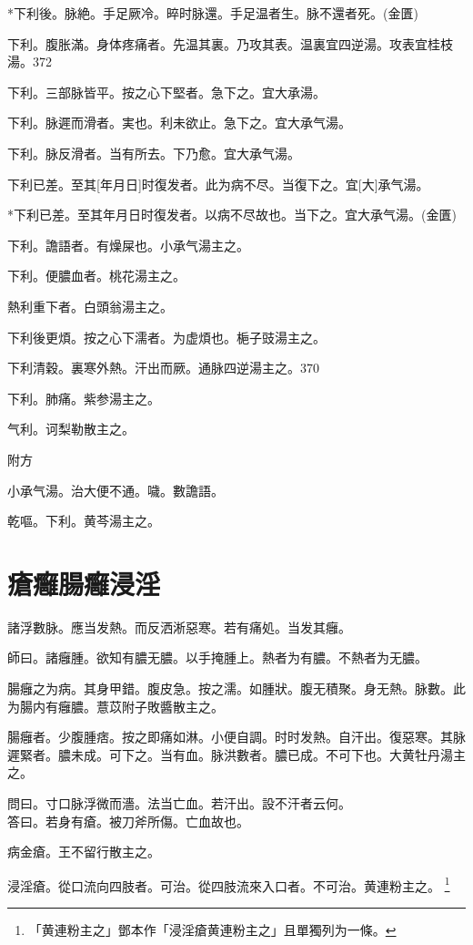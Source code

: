 \documentclass[12pt,oneside,UTF8,b5paper]{ctexbook}她她她她她她她
\begin{document}
*下利後。脉絶。手足厥冷。晬时脉還。手足温者生。脉不還者死。(金匱)

下利。腹胀滿。身体疼痛者。先温其裏。乃攻其表。温裏宜四逆湯。攻表宜桂枝湯。372

下利。三部脉皆平。按之心下堅者。急下之。宜大承湯。

下利。脉遲而滑者。実也。利未欲止。急下之。宜大承气湯。

下利。脉反滑者。当有所去。下乃愈。宜大承气湯。

下利已差。至其[年月日]时復发者。此为病不尽。当復下之。宜[大]承气湯。

*下利已差。至其年月日时復发者。以病不尽故也。当下之。宜大承气湯。(金匱)

下利。譫語者。有燥屎也。小承气湯主之。

下利。便膿血者。桃花湯主之。

熱利重下者。白頭翁湯主之。

下利後更煩。按之心下濡者。为虚煩也。梔子豉湯主之。

下利清穀。裏寒外熱。汗出而厥。通脉四逆湯主之。370

下利。肺痛。紫参湯主之。

气利。诃梨勒散主之。

附方

小承气湯。治大便不通。噦。數譫語。

乾嘔。下利。黄芩湯主之。

\chapter{瘡癰腸癰浸淫}

諸浮數脉。應当发熱。而反洒淅惡寒。若有痛処。当发其癰。

師曰。諸癰腫。欲知有膿无膿。以手掩腫上。熱者为有膿。不熱者为无膿。

腸癰之为病。其身甲錯。腹皮急。按之濡。如腫狀。腹无積聚。身无熱。脉數。此为腸内有癰膿。薏苡附子敗醬散主之。

腸癰者。少腹腫痞。按之即痛如淋。小便自調。时时发熱。自汗出。復惡寒。其脉遲緊者。膿未成。可下之。当有血。脉洪數者。膿已成。不可下也。大黄牡丹湯主之。

問曰。寸口脉浮微而濇。法当亡血。若汗出。設不汗者云何。\\
答曰。若身有瘡。被刀斧所傷。亡血故也。

病金瘡。王不留行散主之。

浸淫瘡。從口流向四肢者。可治。從四肢流來入口者。不可治。黄連粉主之。
	\footnote{「黄連粉主之」鄧本作「浸淫瘡黄連粉主之」且單獨列为一條。}
\end{document}
